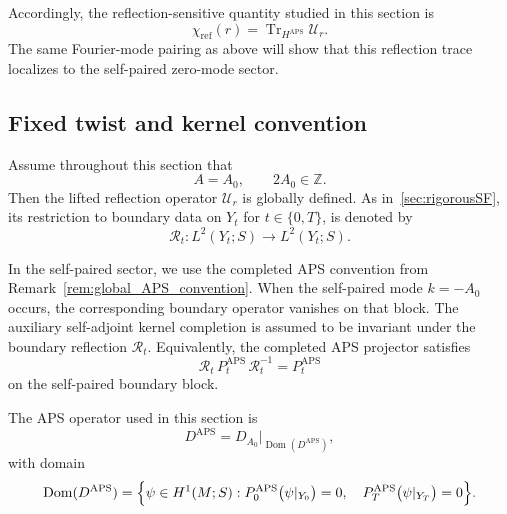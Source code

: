 \documentclass[11pt]{article}
\theoremstyle{definition}
\DeclareMathOperator{\APS}{APS}
\DeclareMathOperator{\Dom}{Dom} \newcommand{\Z}{\mathbb{Z}} \DeclareMathOperator{\Ran}{Ran}
\numberwithin{equation}{section}
\DeclareMathOperator{\Tr}{Tr}
\begin{document}
Accordingly, the reflection-sensitive quantity studied in this section is 
\begin{equation}\label{eq:sec5_reflection_trace}
\chi_{\text{ref}}(r)
=
\Tr_{H^{\APS}} \mathcal U_r.
\end{equation}
The same Fourier-mode pairing as above will show that this reflection trace localizes to the
self-paired zero-mode sector.













\subsection{Fixed twist and kernel convention}

Assume throughout this section that
\begin{equation}\label{eq:sec5_fixed_twist}
A=A_0,
\qquad
2A_0\in\Z.
\end{equation}
Then the lifted reflection operator \(\mathcal U_r\) is globally defined. As in~\autoref{sec:rigorousSF}, its restriction to boundary data on \(Y_t\) for \(t\in\{0,T\}\), is denoted by
\begin{equation}\label{eq:sec5_boundary_reflection_operator}
\mathcal R_t:L^2(Y_t;S)\longrightarrow L^2(Y_t;S).
\end{equation}

In the self-paired sector, we use the completed APS convention from
Remark~\ref{rem:global_APS_convention}. When the self-paired mode \(k=-A_0\) occurs, the
corresponding boundary operator vanishes on that block. The auxiliary self-adjoint kernel
completion is assumed to be invariant under the boundary reflection \(\mathcal R_t\). Equivalently,
the completed APS projector satisfies
\begin{equation}\label{eq:sec5_kernel_invariance}
\mathcal R_t\,P_t^{\APS}\,\mathcal R_t^{-1}
=
P_t^{\APS}
\end{equation}
on the self-paired boundary block.

The APS operator used in this section is
\begin{equation}\label{eq:sec5_APS_operator}
D^{\APS}=D_{A_0}\big|_{\Dom(D^{\APS})},
\end{equation}
with domain
\begin{equation}\label{eq:sec5_APS_domain}
\Dom(D^{\APS})
=
\Bigl\{
\psi\in H^1(M;S):
P_0^{\APS}\bigl(\psi|_{Y_0}\bigr)=0,
\quad
P_T^{\APS}\bigl(\psi|_{Y_T}\bigr)=0
\Bigr\}.
\end{equation}
\end{document}
